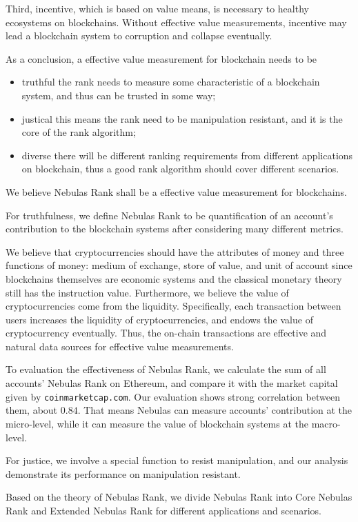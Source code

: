 Third, incentive, which is based on value means, is necessary to healthy
ecosystems on blockchains. Without effective value measurements, incentive may
lead a blockchain system to corruption and collapse eventually.

As a conclusion, a effective value measurement for blockchain needs to be
\begin{itemize}
\item{truthful} the rank needs to measure some characteristic of a
blockchain system, and thus can be trusted in some way;
\item{justical} this means the rank need to be manipulation resistant, and
it is the core of the rank algorithm;
\item{diverse} there will be different ranking requirements from different
applications on blockchain, thus a good rank algorithm should cover different
scenarios.
\end{itemize}

We believe Nebulas Rank shall be a effective value measurement for
blockchains.

For truthfulness, we define Nebulas Rank to be quantification of an account's
contribution to the blockchain systems after considering many different
metrics.

We believe that cryptocurrencies should have the attributes of money and
three functions of money: medium of exchange, store of value, and unit of
account since blockchains themselves are economic systems and the classical
monetary theory still has the instruction value.
Furthermore, we believe the value of cryptocurrencies come from the
liquidity. Specifically, each transaction between users increases the
liquidity of cryptocurrencies, and endows the value of
cryptocurrency eventually. Thus, the on-chain transactions are effective and
natural data sources for effective value measurements.

To evaluation the effectiveness of Nebulas Rank, we calculate the sum of all
accounts' Nebulas Rank on Ethereum, and compare it with the market capital
given by \texttt{coinmarketcap.com}. Our evaluation shows strong
correlation between them, about $0.84$. That means Nebulas can measure
accounts' contribution at the micro-level, while it can measure the
value of blockchain systems at the macro-level.

For justice, we involve a special function to resist manipulation,
and our analysis demonstrate its performance on manipulation
resistant.

Based on the theory of Nebulas Rank, we divide Nebulas Rank into Core Nebulas
Rank and Extended Nebulas Rank for different applications and scenarios.

